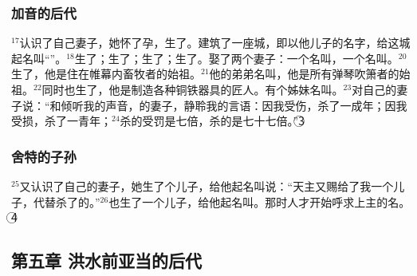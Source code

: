 \subsubsection{加音的后代} $^{17}$\UL[加音]认识了自己妻子，她怀了孕，生了\UL[哈诺客]。\UL[加音]建筑了一座城，即以他儿子的名字，给这城起名叫“\UL[哈诺客]”。$^{18}$\UL[哈诺客]生了\UL[依辣得]；\UL[依辣得]生了\UL[默胡雅耳]；\UL[默胡雅耳]生了\UL[默突沙耳]；\UL[默突沙耳]生了\UL[拉默客]。\UL[拉默客]娶了两个妻子：一个名叫\UL[阿达]，一个名叫\UL[漆拉]。$^{20}$\UL[阿达]生了\UL[雅巴尔]，他是住在帷幕内畜牧者的始祖。$^{21}$他的弟弟名叫\UL[犹巴耳]，他是所有弹琴吹箫者的始祖。$^{22}$同时\UL[漆拉]也生了\UL[突巴耳加音]，他是制造各种铜铁器具的匠人。\UL[突巴耳加音]有个姊妹名叫\UL[纳阿玛]。$^{23}$\UL[拉默客]对自己的妻子说：“\UL[阿达]和\UL[漆拉]倾听我的声音，\UL[拉默客]的妻子，静聆我的言语：因我受伤，杀了一成年；因我受损，杀了一青年；$^{24}$杀\UL[加音]的受罚是七倍，杀\UL[拉默客]的是七十七倍。”\textcircled{3}


\subsubsection{舍特的子孙}
$^{25}$\UL[亚当]又认识了自己的妻子，她生了个儿子，给他起名叫\UL[舍特]说：“天主又赐给了我一个儿子，代替\UL[加音]杀了的\UL[亚伯尔]。”$^{26}$\UL[舍特]也生了一个儿子，给他起名叫\UL[厄诺士]。那时人才开始呼求上主的名。\textcircled{4}


\subsection{第五章 洪水前亚当的后代}




